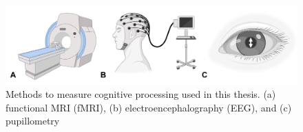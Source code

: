 \begin{figure}[!ht]
	\centering
	\includegraphics[width=1\textwidth, clip=true]{./Chapters/01_Introduction/Images_MM/Methods}
	\caption{Methods to measure cognitive processing used in this thesis. (a) functional MRI (fMRI), (b) electroencephalography (EEG), and (c) pupillometry}
	\vspace*{-10pt}
	\label{fig:methods}
\end{figure}